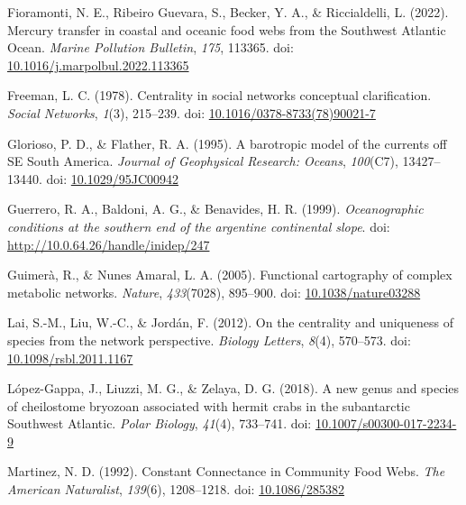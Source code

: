 \documentclass[preprint, 3p,
authoryear]{elsarticle} %
\newlength{\cslhangindent}
\newlength{\cslentryspacingunit} %
\newenvironment{CSLReferences}[2] %
 {%
  \setlength{\parindent}{0pt}
  \ifodd #1
  \let\oldpar\par
  \def\par{\hangindent=\cslhangindent\oldpar}
  \fi
  \setlength{\parskip}{#2\cslentryspacingunit}
 }%
 {}
\begin{document}
\begin{CSLReferences}{1}{0}
\leavevmode{}%
Fioramonti, N. E., Ribeiro Guevara, S., Becker, Y. A., \& Riccialdelli,
L. (2022). Mercury transfer in coastal and oceanic food webs from the
{Southwest Atlantic Ocean}. \emph{Marine Pollution Bulletin},
\emph{175}, 113365. doi:
\href{https://doi.org/10.1016/j.marpolbul.2022.113365}{10.1016/j.marpolbul.2022.113365}

\leavevmode{}%
Freeman, L. C. (1978). Centrality in social networks conceptual
clarification. \emph{Social Networks}, \emph{1}(3), 215--239. doi:
\href{https://doi.org/10.1016/0378-8733(78)90021-7}{10.1016/0378-8733(78)90021-7}

\leavevmode{}%
Glorioso, P. D., \& Flather, R. A. (1995). A barotropic model of the
currents off {SE South America}. \emph{Journal of Geophysical Research:
Oceans}, \emph{100}(C7), 13427--13440. doi:
\href{https://doi.org/10.1029/95JC00942}{10.1029/95JC00942}

\leavevmode{}%
Guerrero, R. A., Baldoni, A. G., \& Benavides, H. R. (1999).
\emph{Oceanographic conditions at the southern end of the argentine
continental slope}. doi: \url{http://10.0.64.26/handle/inidep/247}

\leavevmode{}%
Guimerà, R., \& Nunes Amaral, L. A. (2005). Functional cartography of
complex metabolic networks. \emph{Nature}, \emph{433}(7028), 895--900.
doi: \href{https://doi.org/10.1038/nature03288}{10.1038/nature03288}

\leavevmode{}%
Lai, S.-M., Liu, W.-C., \& Jordán, F. (2012). On the centrality and
uniqueness of species from the network perspective. \emph{Biology
Letters}, \emph{8}(4), 570--573. doi:
\href{https://doi.org/10.1098/rsbl.2011.1167}{10.1098/rsbl.2011.1167}

\leavevmode{}%
López-Gappa, J., Liuzzi, M. G., \& Zelaya, D. G. (2018). A new genus and
species of cheilostome bryozoan associated with hermit crabs in the
subantarctic {Southwest Atlantic}. \emph{Polar Biology}, \emph{41}(4),
733--741. doi:
\href{https://doi.org/10.1007/s00300-017-2234-9}{10.1007/s00300-017-2234-9}

\leavevmode{}%
Martinez, N. D. (1992). Constant {Connectance} in {Community Food Webs}.
\emph{The American Naturalist}, \emph{139}(6), 1208--1218. doi:
\href{https://doi.org/10.1086/285382}{10.1086/285382}


\end{CSLReferences}
\end{document}

